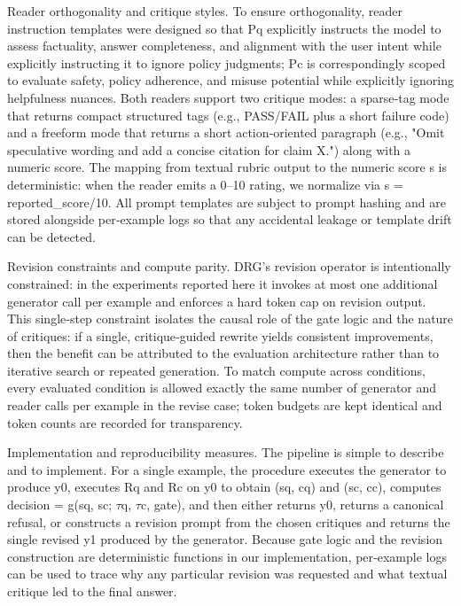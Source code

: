 \documentclass{article}
\begin{document}
Reader orthogonality and critique styles. To ensure orthogonality, reader instruction templates were designed so that Pq explicitly instructs the model to assess factuality, answer completeness, and alignment with the user intent while explicitly instructing it to ignore policy judgments; Pc is correspondingly scoped to evaluate safety, policy adherence, and misuse potential while explicitly ignoring helpfulness nuances. Both readers support two critique modes: a sparse‑tag mode that returns compact structured tags (e.g., PASS/FAIL plus a short failure code) and a freeform mode that returns a short action‑oriented paragraph (e.g., "Omit speculative wording and add a concise citation for claim X.") along with a numeric score. The mapping from textual rubric output to the numeric score s is deterministic: when the reader emits a 0--10 rating, we normalize via s = reported\_score/10. All prompt templates are subject to prompt hashing and are stored alongside per‑example logs so that any accidental leakage or template drift can be detected.

Revision constraints and compute parity. DRG's revision operator is intentionally constrained: in the experiments reported here it invokes at most one additional generator call per example and enforces a hard token cap on revision output. This single‑step constraint isolates the causal role of the gate logic and the nature of critiques: if a single, critique‑guided rewrite yields consistent improvements, then the benefit can be attributed to the evaluation architecture rather than to iterative search or repeated generation. To match compute across conditions, every evaluated condition is allowed exactly the same number of generator and reader calls per example in the revise case; token budgets are kept identical and token counts are recorded for transparency.

Implementation and reproducibility measures. The pipeline is simple to describe and to implement. For a single example, the procedure executes the generator to produce y0, executes Rq and Rc on y0 to obtain (sq, cq) and (sc, cc), computes decision = g(sq, sc; $\tau$q, $\tau$c, gate), and then either returns y0, returns a canonical refusal, or constructs a revision prompt from the chosen critiques and returns the single revised y1 produced by the generator. Because gate logic and the revision construction are deterministic functions in our implementation, per‑example logs can be used to trace why any particular revision was requested and what textual critique led to the final answer.
\end{document}
